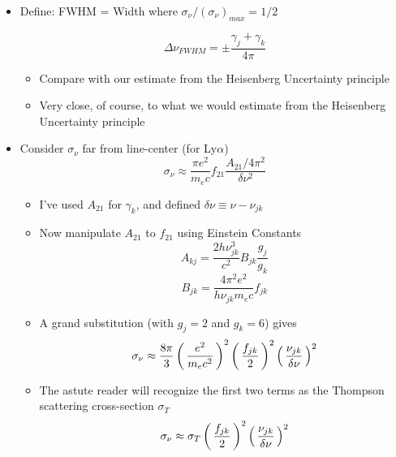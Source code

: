 \documentclass[12pt,letterpaper]{article}
\begin{document}
\begin{Aenumerate}
\begin{itemize}
\begin{itemize}
\begin{itemize}
		\item Define: FWHM = Width where $\sigma_\nu/(\sigma_\nu)_{max} = 1/2$

			\begin{equation}
			\Delta\nu_{FWHM} = \pm \frac{\gamma_j + \gamma_k}{4\pi}
			\end{equation}

			\begin{itemize}
			\item Compare with our estimate from the Heisenberg Uncertainty principle
			\item Very close, of course, to what we would estimate from
			the Heisenberg Uncertainty principle
			\end{itemize}

		\item Consider $\sigma_\nu$ far from line-center (for Ly$\alpha$)
			\begin{equation}
			\sigma_\nu \approx \frac{\pi e^2}{m_e c} f_{21} 
			\frac{A_{21}/4\pi^2}{\delta\nu^2}
			\end{equation}
			\begin{itemize}
			\item I've used $A_{21}$ for $\gamma_k$, and defined 
			$\delta\nu \equiv \nu - \nu_{jk}$
			\item Now manipulate $A_{21}$ to $f_{21}$ using Einstein Constants
			\begin{equation}
			A_{kj} = \frac{2 h \nu_{jk}^3}{c^2} B_{jk} \frac{g_j}{g_k}
			\end{equation}
			\begin{equation}
			B_{jk} = \frac{4 \pi^2 e^2}{h \nu_{jk} m_e c} f_{jk}
			\end{equation}
			\item A grand substitution (with $g_j=2$ and $g_k=6$) gives
			\begin{equation}
			\sigma_\nu \approx \frac{8\pi}{3} \left ( \, \frac{e^2}{m_e c^2} \, \right )^2
				\left ( \, \frac{f_{jk}}{2} \, \right )^2
				\left ( \, \frac{\nu_{jk}}{\delta\nu} \, \right )^2
			\end{equation}
			\item The astute reader will recognize the first two terms
			as the Thompson scattering cross-section $\sigma_T$
			\begin{equation}
			\sigma_\nu \approx \sigma_T \left ( \, \frac{f_{jk}}{2} \, \right )^2
				\left ( \, \frac{\nu_{jk}}{\delta\nu} \, \right )^2
			\end{equation}
			\end{itemize}


\end{itemize}
\end{itemize}
\end{itemize}
\end{Aenumerate}
\end{document}
